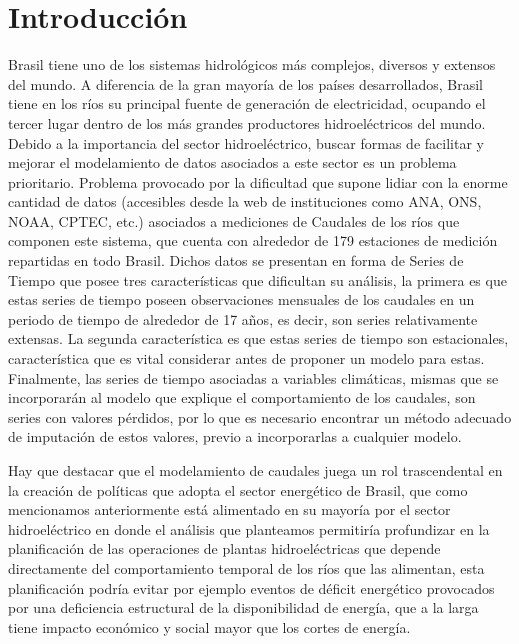 \documentclass[12pt,oneside]{book}\usepackage[]{graphicx}\usepackage[]{color}
\theoremstyle{definition} %
\begin{document}
\mainmatter
\addtolength{\abovedisplayskip}{-1mm}
\addtolength{\belowdisplayskip}{-1mm}






\chapter{Introducción}\label{cap1}


Brasil tiene uno de los sistemas hidrológicos más complejos, diversos y extensos del mundo. A diferencia de la gran mayoría de los países desarrollados, Brasil tiene en los ríos su principal fuente de generación de electricidad, ocupando el tercer lugar dentro de los más grandes productores hidroeléctricos del mundo. Debido a la importancia del sector hidroeléctrico, buscar formas de facilitar y mejorar el modelamiento de datos asociados a este sector es un problema prioritario. Problema provocado por la dificultad que supone lidiar con la enorme cantidad de datos (accesibles desde la web de instituciones como ANA, ONS, NOAA, CPTEC, etc.) asociados a mediciones de Caudales de los ríos que componen este sistema, que cuenta con alrededor de 179 estaciones de medición repartidas en todo Brasil. Dichos datos se presentan en forma de Series de Tiempo que posee tres características que dificultan su análisis, la primera es que estas series de tiempo poseen observaciones mensuales de los caudales en un periodo de tiempo de alrededor de 17 años, es decir, son series relativamente extensas. La segunda característica es que estas series de tiempo son estacionales, característica que es vital considerar antes de proponer un modelo para estas. Finalmente, las series de tiempo asociadas a variables climáticas, mismas que se incorporarán al modelo que explique el comportamiento de los caudales, son series con valores pérdidos, por lo que es necesario encontrar un método adecuado de imputación de estos valores, previo a incorporarlas a cualquier modelo.



Hay que destacar que el modelamiento de caudales juega un rol trascendental en la creación de políticas que adopta el sector energético de Brasil, que como mencionamos anteriormente está alimentado en su mayoría por el sector hidroeléctrico en donde el análisis que planteamos permitiría profundizar en la planificación de las operaciones de plantas hidroeléctricas que depende directamente del comportamiento temporal de los ríos que las alimentan, esta planificación podría evitar por ejemplo eventos de déficit energético provocados por una deficiencia estructural de la disponibilidad de energía, que a la larga tiene impacto económico y social mayor que los cortes de energía.
\end{document}

